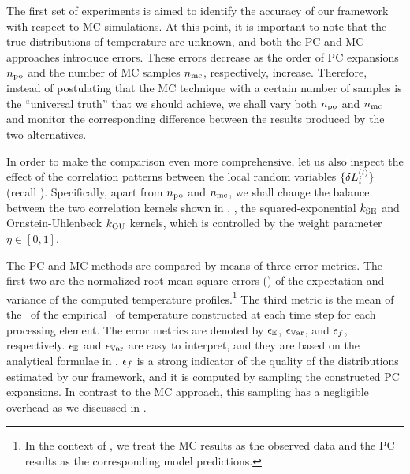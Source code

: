 The first set of experiments is aimed to identify the accuracy of our framework with respect to MC simulations.
At this point, it is important to note that the true distributions of temperature are unknown, and both the PC and MC approaches introduce errors.
These errors decrease as the order of PC expansions ${n_\text{po}}$ and the number of MC samples ${n_\text{mc}}$, respectively, increase.
Therefore, instead of postulating that the MC technique with a certain number of samples is the ``universal truth'' that we should achieve, we shall vary both ${n_\text{po}}$ and ${n_\text{mc}}$ and monitor the corresponding difference between the results produced by the two alternatives.

In order to make the comparison even more comprehensive, let us also inspect the effect of the correlation patterns between the local random variables $\{ \delta L^{(l)}_i \}$ (recall ).
Specifically, apart from ${n_\text{po}}$ and ${n_\text{mc}}$, we shall change the balance between the two correlation kernels shown in , \ie, the squared-exponential $k_{\text{SE}}$ and Ornstein-Uhlenbeck $k_{\text{OU}}$ kernels, which is controlled by the weight parameter $\eta \in [0, 1]$.

The PC and MC methods are compared by means of three error metrics.
The first two are the normalized root mean square errors (\nrmses) of the expectation and variance of the computed temperature profiles.\footnote{In the context of \nrmses, we treat the MC results as the observed data and the PC results as the corresponding model predictions.}
The third metric is the mean of the \nrmses\ of the empirical \pdfs\ of temperature constructed at each time step for each processing element.
The error metrics are denoted by $\epsilon_\mathbb{E}$, $\epsilon_{\mathbb{V}\text{ar}}$, and $\epsilon_f$, respectively.
$\epsilon_\mathbb{E}$ and $\epsilon_{\mathbb{V}\text{ar}}$ are easy to interpret, and they are based on the analytical formulae in .
$\epsilon_f$ is a strong indicator of the quality of the distributions estimated by our framework, and it is computed by sampling the constructed PC expansions.
In contrast to the MC approach, this sampling has a negligible overhead as we discussed in .


